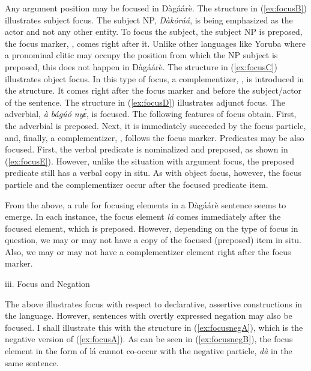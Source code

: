 Any argument position may be focused in Dàgáárè.
The structure in (\ref{ex:focusB}) illustrates subject
focus. The subject NP, \textit{Dàkóráá}, is being emphasized as the actor and not any other entity.
To focus the subject, the subject NP is preposed, the focus marker, \textsc{{\FOC}}, comes right after it.
Unlike other languages like Yoruba where a pronominal clitic may occupy the position from
which the NP subject is preposed, this does not happen in Dàgáárè. The structure
in (\ref{ex:focusC})
illustrates object focus. In this type of focus, a complementizer, {\COMP}, is introduced in the
structure. It comes right after the focus marker and before the subject/actor of the sentence.
The structure in (\ref{ex:focusD}) illustrates adjunct focus. The adverbial, \textit{à bágúó nyɛ́}, is focused.
The following features of focus obtain. First, the adverbial is preposed. Next, it is
immediately succeeded by the focus particle, and, finally, a complementizer, {\COMP}, follows
the focus marker. Predicates may be also focused. First, the verbal predicate is nominalized
and preposed, as shown in (\ref{ex:focusE}). However, unlike the situation with argument focus, the
preposed predicate still has a verbal copy in situ. As with object focus, however, the focus
particle and the complementizer occur after the focused predicate item.



From the above, a rule for focusing elements in a Dàgáárè sentence seems to
emerge. In each instance, the focus element \textit{lá} comes immediately after the focused element,
which is preposed. However, depending on the type of focus in question, we may or may not
have a copy of the focused (preposed) item in situ. Also, we may or may not have a
complementizer element right after the focus marker.\bigskip


\noindent iii. Focus and Negation


The above illustrates focus with respect to declarative, assertive constructions in the
language. However, sentences with overtly expressed negation may also be focused. I shall
illustrate this with the structure in (\ref{ex:focusnegA}), which is the negative version of (\ref{ex:focusA}). As can be
seen in (\ref{ex:focusnegB}), the focus element in the form of lá cannot co-occur with the negative particle,
\textit{dà} in the same sentence.


